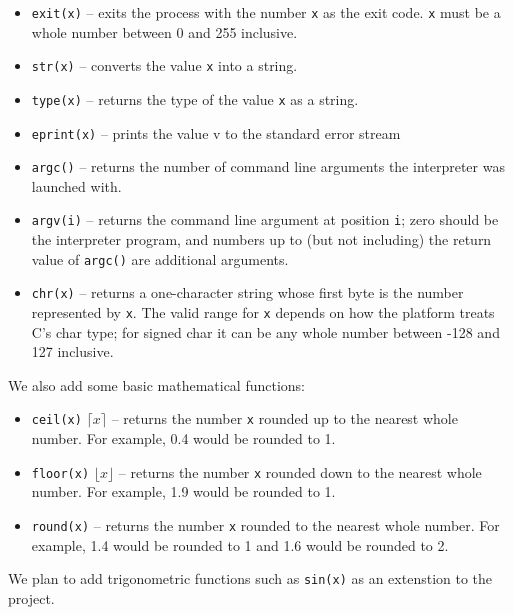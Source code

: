 \begin{itemize}
 \item \verb+exit(x)+ – exits the process with the number \verb+x+ as the exit code. \verb+x+ must be a whole number between 0 and 255 inclusive.
 \item \verb+str(x)+ – converts the value \verb+x+ into a string.
 \item \verb+type(x)+ – returns the type of the value \verb+x+ as a string.
 \item \verb+eprint(x)+ – prints the value v to the standard error stream
 \item \verb+argc()+ – returns the number of command line arguments the interpreter was launched with.
 \item \verb+argv(i)+ – returns the command line argument at position \verb+i+; zero should be the interpreter program, and numbers up to (but not including) the return value of \verb+argc()+ are additional arguments.
 \item \verb+chr(x)+ – returns a one-character string whose first byte is the number represented by \verb+x+. The valid range for \verb+x+ depends on how the platform treats C's char type; for signed char it can be any whole number between -128 and 127 inclusive.
\end{itemize}

We also add some basic mathematical functions:

\begin{itemize}
 \item \verb+ceil(x)+ \( \lceil x \rceil \) – returns the number \verb+x+ rounded up to the nearest whole number. For example, 0.4 would be rounded to 1. 
 \item \verb+floor(x)+ \( \lfloor x \rfloor \) – returns the number \verb+x+ rounded down to the nearest whole number. For example, 1.9 would be rounded to 1.
 \item \verb+round(x)+ – returns the number \verb+x+ rounded to the nearest whole number. For example, 1.4 would be rounded to 1 and 1.6 would be rounded to 2.  
\end{itemize}

We plan to add trigonometric functions such as \verb+sin(x)+ as an extenstion to the project.

